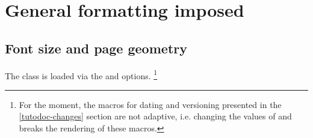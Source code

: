 \documentclass{tutodoc}
\begin{document}
\section{General formatting imposed}

\subsection{Font size and page geometry}

The  class is loaded via the  and  options.%
\footnote{
	For the moment, the macros for dating and versioning presented in the \ref{tutodoc-changes} section are not adaptive, i.e. changing the values of  and  breaks the rendering of these macros.
}
\end{document}
